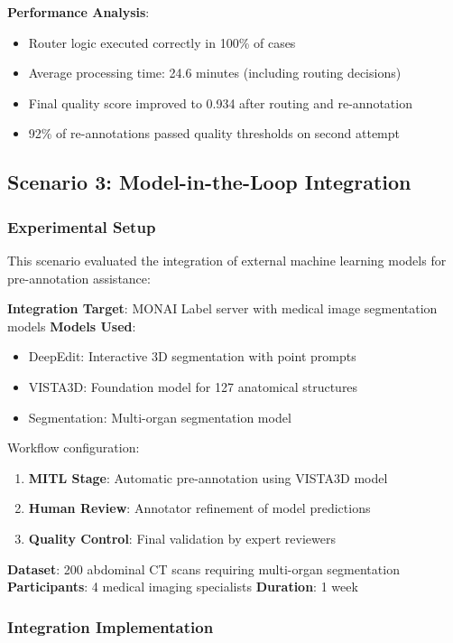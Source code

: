 \textbf{Performance Analysis}:
\begin{itemize}
    \item Router logic executed correctly in 100\% of cases
    \item Average processing time: 24.6 minutes (including routing decisions)
    \item Final quality score improved to 0.934 after routing and re-annotation
    \item 92\% of re-annotations passed quality thresholds on second attempt
\end{itemize}

\subsection{Scenario 3: Model-in-the-Loop Integration}
\label{subsec:scenario-mitl}

\subsubsection{Experimental Setup}

This scenario evaluated the integration of external machine learning models for pre-annotation assistance:

\textbf{Integration Target}: MONAI Label server with medical image segmentation models
\textbf{Models Used}:
\begin{itemize}
    \item DeepEdit: Interactive 3D segmentation with point prompts
    \item VISTA3D: Foundation model for 127 anatomical structures
    \item Segmentation: Multi-organ segmentation model
\end{itemize}

Workflow configuration:
\begin{enumerate}
    \item \textbf{MITL Stage}: Automatic pre-annotation using VISTA3D model
    \item \textbf{Human Review}: Annotator refinement of model predictions
    \item \textbf{Quality Control}: Final validation by expert reviewers
\end{enumerate}

\textbf{Dataset}: 200 abdominal CT scans requiring multi-organ segmentation
\textbf{Participants}: 4 medical imaging specialists
\textbf{Duration}: 1 week

\subsubsection{Integration Implementation}

